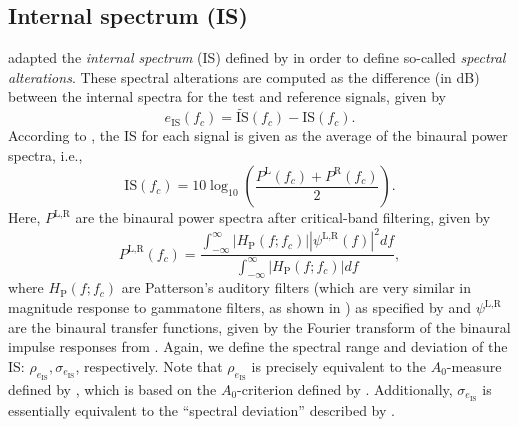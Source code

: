 \subsection{Internal spectrum (IS)}\label{sec:04_Auditory_Models:Coloration_Metrics:Wittek_IS}
\citet{Wittek2007} adapted the \textit{internal spectrum} (IS) defined by \citet[chapter 5]{Salomons1995PhD} in order to define so-called \textit{spectral alterations}.
These spectral alterations are computed as the difference (in dB) between the internal spectra for the test and reference signals, given by
\begin{equation}
e_\text{IS}(f_c) = \widetilde{\text{IS}}(f_c) - \text{IS}(f_c).
\end{equation}
According to \citet[section 3.2.5]{Wittek2007}, the IS for each signal is given as the average of the binaural power spectra, i.e.,
\begin{equation}
\text{IS}(f_c) = 10 \log_{10} \left( \frac{P^\text{L}(f_c) + P^\text{R}(f_c)}{2} \right).
\end{equation}
Here, $P^{\text{L},\text{R}}$ are the binaural power spectra after critical-band filtering, given by \citep[Eq.~(5.12)]{Salomons1995PhD}
\begin{equation}
P^{\text{L},\text{R}}(f_c) = \frac{\displaystyle \int_{-\infty}^\infty |H_\text{P}(f;f_c)| |\psi^{\text{L},\text{R}}(f)|^2 df}{\displaystyle \int_{-\infty}^\infty |H_\text{P}(f;f_c)| df},
\end{equation}
where $H_\text{P}(f;f_c)$ are Patterson's auditory filters (which are very similar in magnitude response to gammatone filters, as shown in ) as specified by \citet[Eq.~(5.9)]{Salomons1995PhD} and $\psi^{\text{L},\text{R}}$ are the binaural transfer functions, given by the Fourier transform of the binaural impulse responses from .
Again, we define the spectral range and deviation of the IS: $\rho_{e_\text{IS}}, \sigma_{e_\text{IS}}$, respectively.
Note that $\rho_{e_\text{IS}}$ is precisely equivalent to the $A_0$-measure defined by \citet[section 3.2.6]{Wittek2007}, which is based on the $A_0$-criterion defined by \citet[section 5.4]{Salomons1995PhD}.
Additionally, $\sigma_{e_\text{IS}}$ is essentially equivalent to the ``spectral deviation'' described by \citet[section 3.2.6]{Wittek2007}.